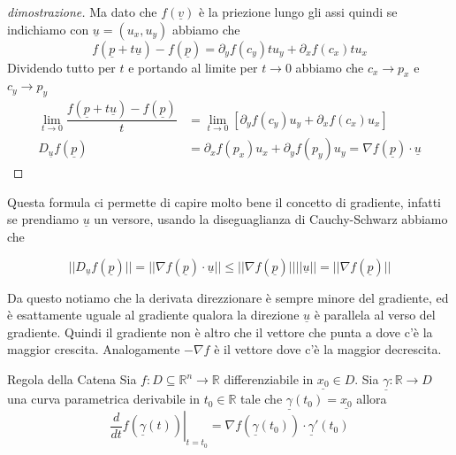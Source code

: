\documentclass{rapport}
\begin{document}
\begin{proof}[dimostrazione]
Ma dato che $f(\underline{v})$ è la priezione lungo gli assi quindi se indichiamo con $\underline{u} = (u_x, u_y)$ abbiamo che 
\[
f(\underline{p} + t\underline{u}) - f(\underline{p}) = \partial_y f (c_y) t u_y + \partial_x f(c_x) t u_x
\]
Dividendo tutto per $t$ e portando al limite per $t\to 0$ abbiamo che $c_x\to p_x$ e $c_y\to p_y$
\begin{align*}
  \lim_{t\to 0}\dfrac{f(\underline{p} + t\underline{u}) - f(\underline{p})}{t} &= \lim_{t\to 0}\left[\partial_y f (c_y)  u_y + \partial_x f(c_x)  u_x \right]\\
  D_{\underline{u}} f(\underline{p}) &= \partial_x f(p_x) u_x+\partial_y f(p_y) u_y = \nabla f(\underline{p}) \cdot \underline{u}
\end{align*}

\end{proof}

Questa formula ci permette di capire molto bene il concetto di gradiente, infatti se prendiamo $\underline{u}$ un versore, usando la diseguaglianza di Cauchy-Schwarz abbiamo che 

\[
|| D_{\underline{u}} f(\underline{p})|| = ||\nabla f(\underline{p}) \cdot \underline{u}|| \leq ||\nabla f(\underline{p})|| || \underline{u}|| = ||\nabla f(\underline{p})||
\]

Da questo notiamo che la derivata direzzionare è sempre minore del gradiente, ed è esattamente uguale al gradiente qualora la direzione $\underline{u}$ è parallela al verso del gradiente. Quindi il gradiente non è altro che il vettore che punta a dove c'è la maggior crescita. Analogamente $-\nabla f$ è il vettore dove c'è la maggior decrescita. 


\begin{proposizione}{Regola della Catena}{}
  Sia $f:D\subseteq\mathbb{R}^n\to \mathbb{R}$ differenziabile in $\underline{x_0} \in D$. Sia $\underline{\gamma} : \mathbb{R} \to D$ una curva parametrica derivabile in $t_0 \in \mathbb{R}$ tale che $\underline{\gamma}(t_0) = \underline{x_0}$ allora
  \[
  \left.\dfrac{d}{dt} f(\underline{\gamma}(t) ) \right|_{t=t_0}= \nabla f(\underline{\gamma}(t_0)) \cdot \underline{\gamma}'(t_0)
  \]
\end{proposizione}
\end{document}

